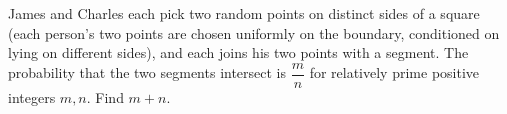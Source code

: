 James and Charles each pick two random points on distinct sides of a square (each person's two points are chosen uniformly on the boundary, conditioned on lying on different sides), and each joins his two points with a segment. The probability that the two segments intersect is $\dfrac mn$ for relatively prime positive integers $m,n$. Find $m+n$.
